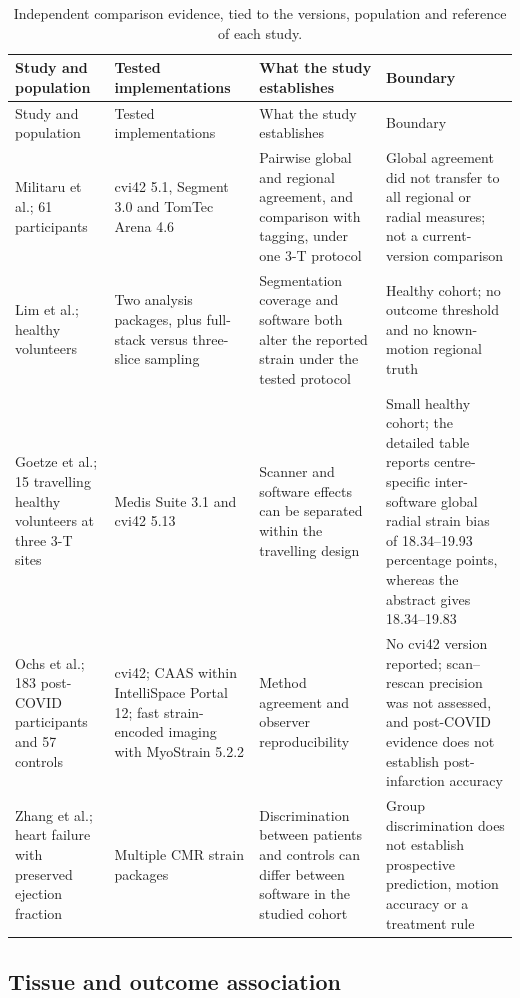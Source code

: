 \begin{longtable}{@{}L{0.20\textwidth}L{0.23\textwidth}L{0.27\textwidth}L{0.24\textwidth}@{}}
\caption{Independent comparison evidence, tied to the versions, population and reference of each
study.}\label{tab:software}\\
\toprule
Study and population & Tested implementations & What the study establishes & Boundary\\
\midrule
\endfirsthead
\toprule
Study and population & Tested implementations & What the study establishes & Boundary\\
\midrule
\endhead
Militaru et al.; 61 participants & cvi42 5.1, Segment 3.0 and TomTec Arena 4.6 & Pairwise global and regional agreement, and comparison with tagging, under one 3-T protocol~\citep{militaru2021} & Global agreement did not transfer to all regional or radial measures; not a current-version comparison\\
Lim et al.; healthy volunteers & Two analysis packages, plus full-stack versus three-slice sampling & Segmentation coverage and software both alter the reported strain under the tested protocol~\citep{lim2021} & Healthy cohort; no outcome threshold and no known-motion regional truth\\
Goetze et al.; 15 travelling healthy volunteers at three 3-T sites & Medis Suite 3.1 and cvi42 5.13 & Scanner and software effects can be separated within the travelling design~\citep{goetze2026} & Small healthy cohort; the detailed table reports centre-specific inter-software global radial strain bias of 18.34--19.93 percentage points, whereas the abstract gives 18.34--19.83\\
Ochs et al.; 183 post-COVID participants and 57 controls & cvi42; CAAS within IntelliSpace Portal 12; fast strain-encoded imaging with MyoStrain 5.2.2 & Method agreement and observer reproducibility~\citep{ochs2026} & No cvi42 version reported; scan--rescan precision was not assessed, and post-COVID evidence does not establish post-infarction accuracy\\
Zhang et al.; heart failure with preserved ejection fraction & Multiple CMR strain packages & Discrimination between patients and controls can differ between software in the studied cohort~\citep{zhang2021hfp} & Group discrimination does not establish prospective prediction, motion accuracy or a treatment rule\\
\bottomrule
\end{longtable}

\subsection{Tissue and outcome association}\label{sec:association}

